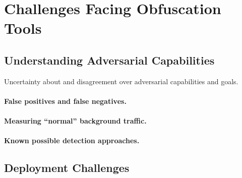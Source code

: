 %
\section{Challenges Facing Obfuscation Tools}
\label{section:challenges}
     
\subsection{Understanding Adversarial Capabilities}

Uncertainty about and disagreement over adversarial capabilities
and goals. 

\paragraph{False positives and false negatives.} 


\paragraph{Measuring ``normal'' background traffic.}


\paragraph{Known possible detection approaches.} 

\subsection{Deployment Challenges}




